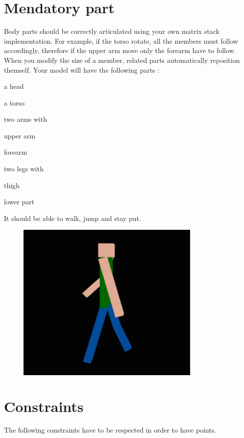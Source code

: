 \documentclass{42-en}
\newenvironment{ft_itemize}
{ \begin{itemize}
	\setlength{\itemsep}{0pt}
	\setlength{\parskip}{0pt}
	\setlength{\parsep}{0pt}     }
{ \end{itemize}                  }
\begin{document}
		\section{Mendatory part}
		Body parts should be correctly articulated using your own matrix stack implementation. For example, if the torso rotate, all the members must follow accordingly, therefore if the upper arm move only the forearm have to follow. When you modify the size of a member, related parts automatically reposition themself.\newline
		Your model will have the following parts :
		\begin{ft_itemize}
			\item a head
			\item a torso
			\item two arms with
			\begin{ft_itemize}
				\item upper arm
				\item forearm
			\end{ft_itemize}
			\item two legs with
			\begin{ft_itemize}
				\item thigh
				\item lower part
			\end{ft_itemize}
		\end{ft_itemize}
		{
			\noindent
			It should be able to walk, jump and stay put.
		}
		\begin{figure}[ht!]
			\centering
				\includegraphics[width=90mm]{images/humangl-walking.png}
		\end{figure}
\newpage
	\section{Constraints}
		The following constraints have to be respected in order to have points.
\end{document}
